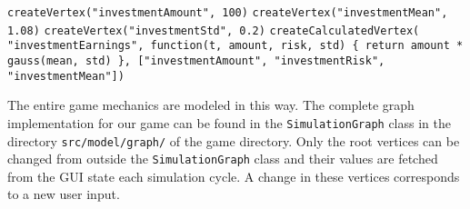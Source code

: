  \begin{algorithmic}[1]
 	\STATE \texttt{createVertex("investmentAmount", 100)}
    \STATE \texttt{createVertex("investmentMean", 1.08)}
    \STATE \texttt{createVertex("investmentStd", 0.2)}
	\STATE \texttt{createCalculatedVertex(\newline \hspace*{1mm} "investmentEarnings",\newline \hspace*{2mm} function(t, amount, risk, std) \{ \newline \hspace*{10mm}return amount * gauss(mean, std)  \newline \hspace*{2mm} \},\newline \hspace*{2mm} ["investmentAmount", "investmentRisk", "investmentMean"]\newline )}    
  \end{algorithmic}
  \vspace{1cm}
  The entire game mechanics are modeled in this way. The complete graph implementation for our game can be found in the \texttt{SimulationGraph} class in the directory \texttt{src/model/graph/} of the game directory. Only the root vertices can be changed from outside the \texttt{SimulationGraph} class and their values are fetched from the GUI state each simulation cycle. A change in these vertices corresponds to a new user input.